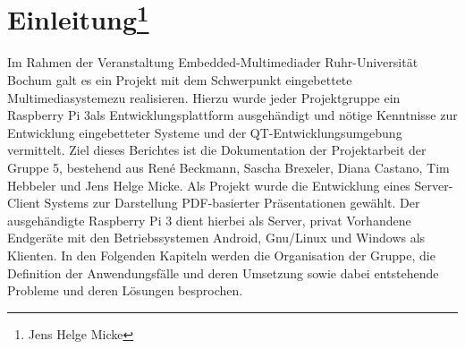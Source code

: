 \chapter[Einleitung]{Einleitung\footnote{Jens Helge Micke}}
\thispagestyle{fancy}
\label{[Einleitung]}
Im Rahmen der Veranstaltung \glqq Embedded-Multimedia\grqq der Ruhr-Universität Bochum galt es ein Projekt mit dem Schwerpunkt \glqq eingebettete Multimediasysteme\grqq zu realisieren.
Hierzu wurde jeder Projektgruppe ein \glqq Raspberry Pi 3\grqq als Entwicklungsplattform ausgehändigt und nötige Kenntnisse zur Entwicklung eingebetteter Systeme und der QT-Entwicklungsumgebung vermittelt.
Ziel dieses Berichtes ist die Dokumentation der Projektarbeit der Gruppe 5, bestehend aus René Beckmann, Sascha Brexeler, Diana Castano, Tim Hebbeler und Jens Helge Micke.
Als Projekt wurde die Entwicklung eines Server-Client Systems zur Darstellung PDF-basierter Präsentationen gewählt.
Der ausgehändigte \glqq Raspberry Pi 3 \grqq dient hierbei als Server, privat Vorhandene Endgeräte mit den Betriebssystemen Android, Gnu/Linux und Windows als Klienten.
In den Folgenden Kapiteln werden die Organisation der Gruppe, die Definition der Anwendungsfälle und deren Umsetzung sowie dabei entstehende Probleme und deren Lösungen besprochen.